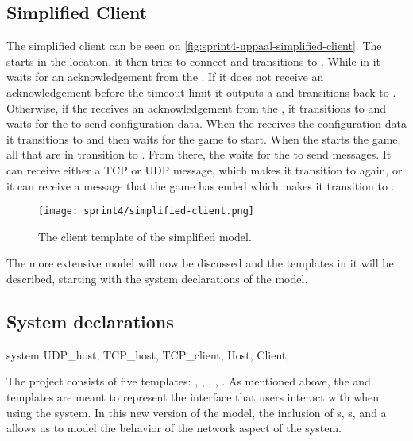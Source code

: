 \subsection*{Simplified Client}
The simplified client can be seen on  \autoref{fig:sprint4-uppaal-simplified-client}.
The  starts in the  location, it then tries to connect and transitions to .
While in  it waits for an acknowledgement from the .
If it does not receive an acknowledgement before the timeout limit it outputs a  and transitions back to .
Otherwise, if the  receives an acknowledgement from the , it transitions to  and waits for the  to send configuration data.
When the  receives the configuration data it transitions to  and then waits for the game to start.
When the  starts the game, all  that are in  transition to .
From there, the  waits for the  to send messages.
It can receive either a TCP or UDP message, which makes it transition to  again, or it can receive a message that the game has ended which makes it transition to .
\begin{figure}[h]
    \centering
    \texttt{[image: sprint4/simplified-client.png]}
    \caption{The client template of the simplified \uppaal model.}
    \label{fig:sprint4-uppaal-simplified-client}
\end{figure}

\noindent
The more extensive \uppaal model will now be discussed and the templates in it will be described, starting with the system declarations of the model.

\subsection{System declarations}
\begin{uppaalcode}[caption={System declarations}, label={lst:uppaal4:systemdecl},captionpos=b]
    system UDP_host, TCP_host, TCP_client, Host, Client;
\end{uppaalcode}
The project consists of five templates: , , , , .
As mentioned above, the  and  templates are meant to represent the interface that users interact with when using the system.
In this new version of the model, the inclusion of s, s, and a  allows us to model the behavior of the network aspect of the system.

